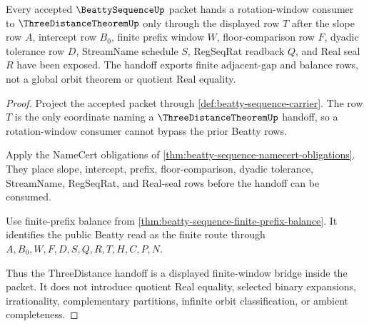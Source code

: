 \begin{theorem}
\label{thm:beatty-sequence-three-distance-handoff}
Every accepted $\BeattySequenceUp$ packet hands a rotation-window consumer to $\ThreeDistanceTheoremUp$ only through the displayed row $T$ after the slope row $A$, intercept row $B_0$, finite prefix window $W$, floor-comparison row $F$, dyadic tolerance row $D$, StreamName schedule $S$, RegSeqRat readback $Q$, and Real seal $R$ have been exposed. The handoff exports finite adjacent-gap and balance rows, not a global orbit theorem or quotient Real equality.
\end{theorem}
\begin{proof}
Project the accepted packet through \autoref{def:beatty-sequence-carrier}. The row $T$ is the only coordinate naming a $\ThreeDistanceTheoremUp$ handoff, so a rotation-window consumer cannot bypass the prior Beatty rows.

Apply the NameCert obligations of \autoref{thm:beatty-sequence-namecert-obligations}. They place slope, intercept, prefix, floor-comparison, dyadic tolerance, StreamName, RegSeqRat, and Real-seal rows before the handoff can be consumed.

Use finite-prefix balance from \autoref{thm:beatty-sequence-finite-prefix-balance}. It identifies the public Beatty read as the finite route through $A,B_0,W,F,D,S,Q,R,T,H,C,P,N$.

Thus the ThreeDistance handoff is a displayed finite-window bridge inside the packet. It does not introduce quotient Real equality, selected binary expansions, irrationality, complementary partitions, infinite orbit classification, or ambient completeness.
\end{proof}


\begin{closurestatus}{\BeattySequenceUp}
  \theoryclosure{\seedClosure}
  \formalstatus{\unformalizedV}
\end{closurestatus}
